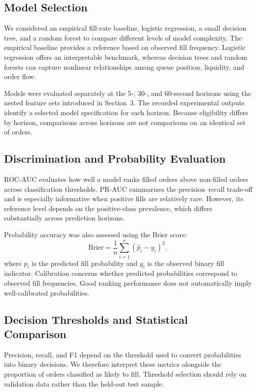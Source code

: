 \documentclass[11pt,a4paper]{article}
\begin{document}
\subsection{Model Selection}

We considered an empirical fill-rate baseline, logistic regression,
a small decision tree, and a random forest to compare different
levels of model complexity. The empirical baseline provides a
reference based on observed fill frequency. Logistic regression
offers an interpretable benchmark, whereas decision trees and
random forests can capture nonlinear relationships among queue
position, liquidity, and order flow.

Models were evaluated separately at the 5-, 30-, and 60-second
horizons using the nested feature sets introduced in Section~3.
The recorded experimental outputs identify a selected model
specification for each horizon. Because eligibility differs by
horizon, comparisons across horizons are not comparisons on an
identical set of orders.

\subsection{Discrimination and Probability Evaluation}

ROC-AUC evaluates how well a model ranks filled orders above
non-filled orders across classification thresholds. PR-AUC
summarizes the precision--recall trade-off and is especially
informative when positive fills are relatively rare. However,
its reference level depends on the positive-class prevalence,
which differs substantially across prediction horizons.

Probability accuracy was also assessed using the Brier score:
\begin{equation}
\mathrm{Brier}=\frac{1}{n}\sum_{i=1}^{n}(\hat p_i-y_i)^2,
\label{eq:brier}
\end{equation}
where $\hat p_i$ is the predicted fill probability and $y_i$
is the observed binary fill indicator. Calibration concerns
whether predicted probabilities correspond to observed fill
frequencies. Good ranking performance does not automatically
imply well-calibrated probabilities.

\subsection{Decision Thresholds and Statistical Comparison}

Precision, recall, and F1 depend on the threshold used to
convert probabilities into binary decisions. We therefore
interpret these metrics alongside the proportion of orders
classified as likely to fill. Threshold selection should rely
on validation data rather than the held-out test sample.
\end{document}
